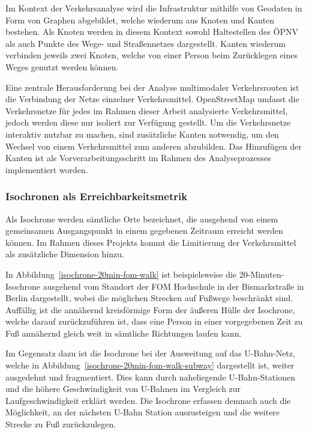 Im Kontext der Verkehrsanalyse wird die Infrastruktur mithilfe von Geodaten in Form von Graphen abgebildet, welche wiederum aus Knoten und Kanten bestehen. Als Knoten werden in diesem Kontext sowohl Haltestellen des \ac{ÖPNV} als auch Punkte des Wege- und Straßennetzes dargestellt. Kanten wiederum verbinden jeweils zwei Knoten, welche von einer Person beim Zurücklegen eines Weges genutzt werden können.

Eine zentrale Herausforderung bei der Analyse multimodaler Verkehrsrouten ist die Verbindung der Netze einzelner Verkehrsmittel. OpenStreetMap umfasst die Verkehrsnetze für jedes im Rahmen dieser Arbeit analysierte Verkehrsmittel, jedoch werden diese nur isoliert zur Verfügung gestellt. Um die Verkehrsnetze interaktiv nutzbar zu machen, sind zusätzliche Kanten notwendig, um den Wechsel von einem Verkehrsmittel zum anderen abzubilden. Das Hinzufügen der Kanten ist als Vorverarbeitungsschritt im Rahmen des Analyseprozesses implementiert worden.

\subsubsection{Isochronen als Erreichbarkeitsmetrik}
\label{isochronen_als_vergleichbarkeitsmetrik}

Als Isochrone werden sämtliche Orte bezeichnet, die ausgehend von einem gemeinsamen Ausgangspunkt in einem gegebenen Zeitraum erreicht werden können. Im Rahmen dieses Projekts kommt die Limitierung der Verkehrsmittel als zusätzliche Dimension hinzu.

In Abbildung~\ref{isochrone-20min-fom-walk} ist beispielsweise die 20-Minuten-Isochrone ausgehend vom Standort der FOM Hochschule in der Bismarkstraße in Berlin dargestellt, wobei die möglichen Strecken auf Fußwege beschränkt sind. Auffällig ist die annähernd kreisförmige Form der äußeren Hülle der Isochrone, welche darauf zurückzuführen ist, dass eine Person in einer vorgegebenen Zeit zu Fuß annähernd gleich weit in sämtliche Richtungen laufen kann.


Im Gegensatz dazu ist die Isochrone bei der Ausweitung auf das U-Bahn-Netz, welche in Abbildung~\ref{isochrone-20min-fom-walk-subway} dargestellt ist, weiter ausgedehnt und fragmentiert. Dies kann durch naheliegende U-Bahn-Stationen und die höhere Geschwindigkeit von U-Bahnen im Vergleich zur Laufgeschwindigkeit erklärt werden. Die Isochrone erfassen demnach auch die Möglichkeit, an der nächsten U-Bahn Station auszusteigen und die weitere Strecke zu Fuß zurückzulegen.

